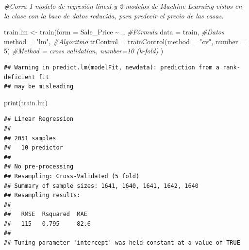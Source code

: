 \documentclass[
]{article}
\newenvironment{Shaded}{\begin{snugshade}}{\end{snugshade}}
\newcommand{\AttributeTok}[1]{\textcolor[rgb]{0.77,0.63,0.00}{#1}}
\newcommand{\CommentTok}[1]{\textcolor[rgb]{0.56,0.35,0.01}{\textit{#1}}}
\newcommand{\DecValTok}[1]{\textcolor[rgb]{0.00,0.00,0.81}{#1}}
\newcommand{\FunctionTok}[1]{\textcolor[rgb]{0.00,0.00,0.00}{#1}}
\newcommand{\NormalTok}[1]{#1}
\newcommand{\OtherTok}[1]{\textcolor[rgb]{0.56,0.35,0.01}{#1}}
\newcommand{\SpecialCharTok}[1]{\textcolor[rgb]{0.00,0.00,0.00}{#1}}
\newcommand{\StringTok}[1]{\textcolor[rgb]{0.31,0.60,0.02}{#1}}
\begin{document}
\begin{Shaded}
\begin{Highlighting}[]
\CommentTok{\#Corra 1 modelo de regresión lineal y 2 modelos de Machine Learning vistos en la clase con la base de datos reducida,  para predecir el precio de las casas.}

\NormalTok{train.lm }\OtherTok{\textless{}{-}} \FunctionTok{train}\NormalTok{(}\AttributeTok{form =}\NormalTok{ Sale\_Price }\SpecialCharTok{\textasciitilde{}}\NormalTok{ ., }\CommentTok{\#Fórmula}
  \AttributeTok{data =}\NormalTok{ train, }\CommentTok{\#Datos}
  \AttributeTok{method =} \StringTok{"lm"}\NormalTok{, }\CommentTok{\#Algoritmo }
  \AttributeTok{trControl =} \FunctionTok{trainControl}\NormalTok{(}\AttributeTok{method =} \StringTok{"cv"}\NormalTok{, }\AttributeTok{number =} \DecValTok{5}\NormalTok{) }\CommentTok{\#Method = cross validation, number=10 (k{-}fold) }
\NormalTok{)}
\end{Highlighting}
\end{Shaded}

\begin{verbatim}
## Warning in predict.lm(modelFit, newdata): prediction from a rank-deficient fit
## may be misleading
\end{verbatim}

\begin{Shaded}
\begin{Highlighting}[]
\FunctionTok{print}\NormalTok{(train.lm)}
\end{Highlighting}
\end{Shaded}

\begin{verbatim}
## Linear Regression 
## 
## 2051 samples
##   10 predictor
## 
## No pre-processing
## Resampling: Cross-Validated (5 fold) 
## Summary of sample sizes: 1641, 1640, 1641, 1642, 1640 
## Resampling results:
## 
##   RMSE  Rsquared  MAE 
##   115   0.795     82.6
## 
## Tuning parameter 'intercept' was held constant at a value of TRUE
\end{verbatim}

\begin{Shaded}
\end{Shaded}
\end{document}
